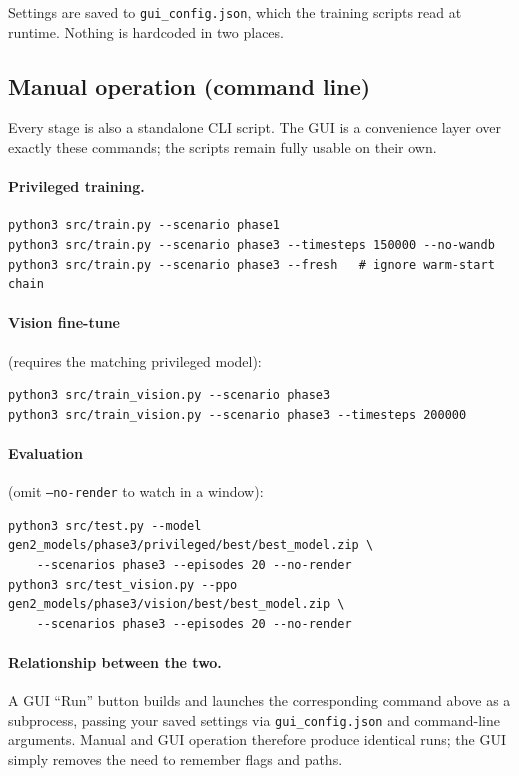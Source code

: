 \documentclass[11pt]{article}
\begin{document}
Settings are saved to \texttt{gui\_config.json}, which the training scripts
read at runtime. Nothing is hardcoded in two places.

\subsection{Manual operation (command line)}

Every stage is also a standalone CLI script. The GUI is a convenience layer
over exactly these commands; the scripts remain fully usable on their own.

\paragraph{Privileged training.}
\begin{verbatim}
python3 src/train.py --scenario phase1
python3 src/train.py --scenario phase3 --timesteps 150000 --no-wandb
python3 src/train.py --scenario phase3 --fresh   # ignore warm-start chain
\end{verbatim}

\paragraph{Vision fine-tune} (requires the matching privileged model):
\begin{verbatim}
python3 src/train_vision.py --scenario phase3
python3 src/train_vision.py --scenario phase3 --timesteps 200000
\end{verbatim}

\paragraph{Evaluation} (omit \texttt{--no-render} to watch in a window):
\begin{verbatim}
python3 src/test.py --model gen2_models/phase3/privileged/best/best_model.zip \
    --scenarios phase3 --episodes 20 --no-render
python3 src/test_vision.py --ppo gen2_models/phase3/vision/best/best_model.zip \
    --scenarios phase3 --episodes 20 --no-render
\end{verbatim}

\paragraph{Relationship between the two.} A GUI ``Run'' button builds and
launches the corresponding command above as a subprocess, passing your saved
settings via \texttt{gui\_config.json} and command-line arguments. Manual and
GUI operation therefore produce identical runs; the GUI simply removes the
need to remember flags and paths.
\end{document}
